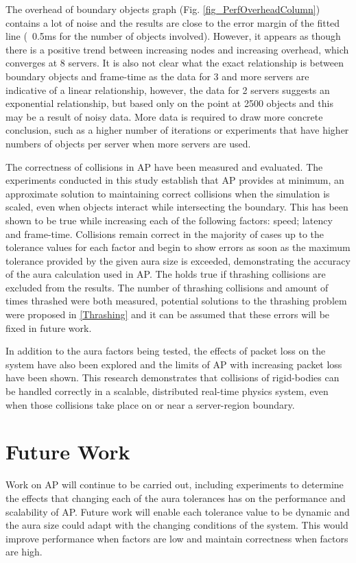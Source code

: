 The overhead of boundary objects graph (Fig. \ref{fig_PerfOverheadColumn}) contains a lot of noise and the results are close to the error margin of the fitted line (~0.5ms for the number of objects involved). However, it appears as though there is a positive trend between increasing nodes and increasing overhead, which converges at 8 servers. It is also not clear what the exact relationship is between boundary objects and frame-time as the data for 3 and more servers are indicative of a linear relationship, however, the data for 2 servers suggests an exponential relationship, but based only on the point at 2500 objects and this may be a result of noisy data. More data is required to draw more concrete conclusion, such as a higher number of iterations or experiments that have higher numbers of objects per server when more servers are used.

The correctness of collisions in AP have been measured and evaluated. The experiments conducted in this study establish that AP provides at minimum, an approximate solution to maintaining correct collisions when the simulation is scaled, even when objects interact while intersecting the boundary. This has been shown to be true while increasing each of the following factors: speed; latency and frame-time. Collisions remain correct in the majority of cases up to the tolerance values for each factor and begin to show errors as soon as the maximum tolerance provided by the given aura size is exceeded, demonstrating the accuracy of the aura calculation used in AP. The holds true if thrashing collisions are excluded from the results. The number of thrashing collisions and amount of times thrashed were both measured, potential solutions to the thrashing problem were proposed in \ref{Thrashing} and it can be assumed that these errors will be fixed in future work.

In addition to the aura factors being tested, the effects of packet loss on the system have also been explored and the limits of AP with increasing packet loss have been shown. This research demonstrates that collisions of rigid-bodies can be handled correctly in a scalable, distributed real-time physics system, even when those collisions take place on or near a server-region boundary.

\section{Future Work}
Work on AP will continue to be carried out, including experiments to determine the effects that changing each of the aura tolerances has on the performance and scalability of AP. Future work will enable each tolerance value to be dynamic and the aura size could adapt with the changing conditions of the system. This would improve performance when factors are low and maintain correctness when factors are high.

